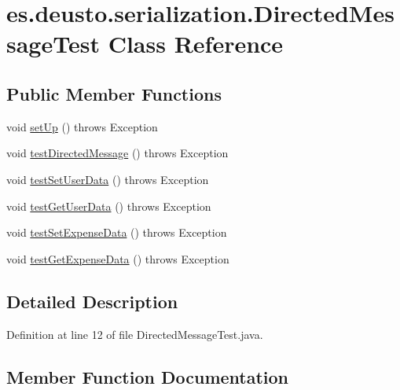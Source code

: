 \hypertarget{classes_1_1deusto_1_1serialization_1_1_directed_message_test}{}\section{es.\+deusto.\+serialization.\+Directed\+Message\+Test Class Reference}
\label{classes_1_1deusto_1_1serialization_1_1_directed_message_test}
\subsection*{Public Member Functions}
\begin{DoxyCompactItemize}
\item 
void \hyperlink{classes_1_1deusto_1_1serialization_1_1_directed_message_test_af63ee0427d30aaf340f96cabbcb8775e}{set\+Up} ()  throws Exception 
\item 
void \hyperlink{classes_1_1deusto_1_1serialization_1_1_directed_message_test_a704726ef8705632cb089bc25d8283b75}{test\+Directed\+Message} ()  throws Exception 
\item 
void \hyperlink{classes_1_1deusto_1_1serialization_1_1_directed_message_test_a91132b0ba7c7932be8b7dfded1e7e74a}{test\+Set\+User\+Data} ()  throws Exception 
\item 
void \hyperlink{classes_1_1deusto_1_1serialization_1_1_directed_message_test_a35a07f027c5c110942644ebe2ac429b9}{test\+Get\+User\+Data} ()  throws Exception 
\item 
void \hyperlink{classes_1_1deusto_1_1serialization_1_1_directed_message_test_abe0459a79b0888b65191c8662fdad324}{test\+Set\+Expense\+Data} ()  throws Exception 
\item 
void \hyperlink{classes_1_1deusto_1_1serialization_1_1_directed_message_test_a142287faad08832ef77c93c8e1ffe0b3}{test\+Get\+Expense\+Data} ()  throws Exception 
\end{DoxyCompactItemize}


\subsection{Detailed Description}


Definition at line 12 of file Directed\+Message\+Test.\+java.



\subsection{Member Function Documentation}
\mbox{\label{classes_1_1deusto_1_1serialization_1_1_directed_message_test_af63ee0427d30aaf340f96cabbcb8775e}} 
